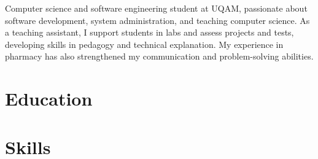 \documentclass[letterpaper,10pt]{article}
\begin{document}


  Computer science and software engineering student at UQAM, passionate about software development, system administration, and teaching computer science. As a teaching assistant, I support students in labs and assess projects and tests, developing skills in pedagogy and technical explanation. My experience in pharmacy has also strengthened my communication and problem-solving abilities.


  \section{Education}



  \section{Skills}
\end{document}
